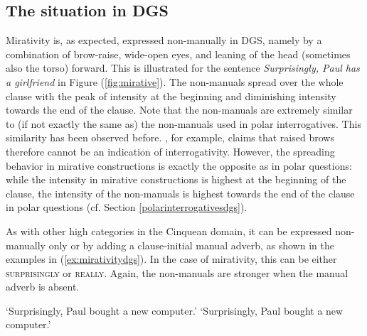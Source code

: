 \subsection{The situation in DGS}
Mirativity is, as expected, expressed non-manually in DGS, namely by a combination of brow-raise, wide-open eyes, and leaning of the head (sometimes also the torso) forward. This is illustrated for the sentence \textit{Surprisingly, Paul has a girlfriend} in Figure (\ref{fig:mirative}). The non-manuals spread over the whole clause with the peak of intensity at the beginning and diminishing intensity towards the end of the clause. Note that the non-manuals are extremely similar to (if not exactly the same as) the non-manuals used in polar interrogatives. This similarity has been observed before. \citet[134]{herrmann2013modal}, for example, claims that raised brows therefore cannot be an indication of interrogativity. However, the spreading behavior in mirative constructions is exactly the opposite as in polar questions: while the intensity in mirative constructions is highest at the beginning of the clause, the intensity of the non-manuals is highest towards the end of the clause in polar questions (cf. Section \ref{polarinterrogativesdgs}). 

As with other high categories in the Cinquean domain, it can be expressed non-manually only or by adding a clause-initial manual adverb, as shown in the examples in (\ref{ex:mirativitydgs}). In the case of mirativity, this can be either \textsc{surprisingly} or \textsc{really}. Again, the non-manuals are stronger when the manual adverb is absent. %


\begin{exe}
\ex\label{ex:mirativitydgs}\begin{xlist}
\ex {}
\glt `Surprisingly, Paul bought a new computer.'\label{ex:mirativitydgsa}
\ex {}
\glt `Surprisingly, Paul bought a new computer.'
\end{xlist}
\end{exe}

